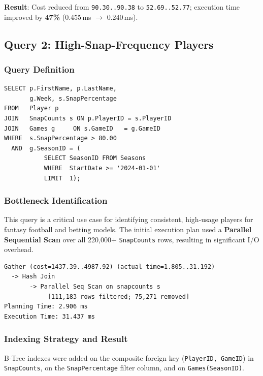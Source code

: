 \documentclass[conference]{IEEEtran}
\begin{document}
\textbf{Result}: Cost reduced from \texttt{90.30..90.38} to \texttt{52.69..52.77}; execution time improved by \textbf{47\%} (0.455\,ms $\rightarrow$ 0.240\,ms).

\subsection{Query 2: High-Snap-Frequency Players}

\subsubsection{Query Definition}


\begin{lstlisting}[style=sqlstyle, caption={High snap-frequency player query}]
SELECT p.FirstName, p.LastName,
       g.Week, s.SnapPercentage
FROM   Player p
JOIN   SnapCounts s ON p.PlayerID = s.PlayerID
JOIN   Games g     ON s.GameID   = g.GameID
WHERE  s.SnapPercentage > 80.00
  AND  g.SeasonID = (
           SELECT SeasonID FROM Seasons
           WHERE  StartDate >= '2024-01-01'
           LIMIT  1);
\end{lstlisting}

\subsubsection{Bottleneck Identification}

This query is a critical use case for identifying consistent, high-usage players for fantasy football and betting models. The initial execution plan used a \textbf{Parallel Sequential Scan} over all 220{,}000+ \texttt{SnapCounts} rows, resulting in significant I/O overhead.

\begin{lstlisting}[style=planstyle, caption={Initial plan -- Query 2 (before index)}]
Gather (cost=1437.39..4987.92) (actual time=1.805..31.192)
  -> Hash Join
       -> Parallel Seq Scan on snapcounts s
            [111,183 rows filtered; 75,271 removed]
Planning Time: 2.906 ms
Execution Time: 31.437 ms
\end{lstlisting}

\subsubsection{Indexing Strategy and Result}

B-Tree indexes were added on the composite foreign key (\texttt{PlayerID, GameID}) in \texttt{SnapCounts}, on the \texttt{SnapPercentage} filter column, and on \texttt{Games(SeasonID)}.
\end{document}
